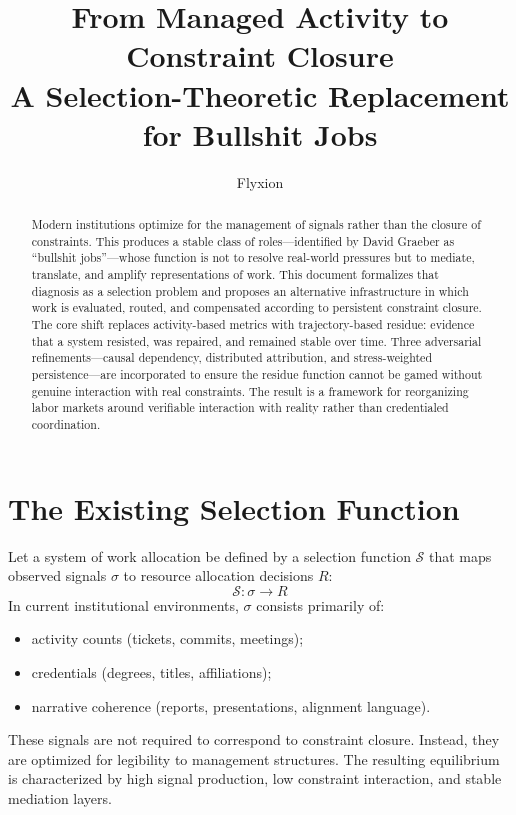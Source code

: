 \documentclass[12pt]{article}
\title{\textbf{From Managed Activity to Constraint Closure}\\[0.5em]
\large A Selection-Theoretic Replacement for Bullshit Jobs}
\author{Flyxion}
\date{}
\begin{document}
\maketitle

\begin{abstract}
Modern institutions optimize for the management of signals rather than
the closure of constraints. This produces a stable class of
roles---identified by David Graeber as ``bullshit jobs''---whose
function is not to resolve real-world pressures but to mediate,
translate, and amplify representations of work. This document
formalizes that diagnosis as a selection problem and proposes an
alternative infrastructure in which work is evaluated, routed, and
compensated according to persistent constraint closure. The core shift
replaces activity-based metrics with trajectory-based residue: evidence
that a system resisted, was repaired, and remained stable over time.
Three adversarial refinements---causal dependency, distributed
attribution, and stress-weighted persistence---are incorporated to
ensure the residue function cannot be gamed without genuine interaction
with real constraints. The result is a framework for reorganizing labor
markets around verifiable interaction with reality rather than
credentialed coordination.
\end{abstract}

\section{The Existing Selection Function}

Let a system of work allocation be defined by a selection function
$\mathcal{S}$ that maps observed signals $\sigma$ to resource allocation
decisions $R$:
\[
  \mathcal{S} : \sigma \rightarrow R
\]
In current institutional environments, $\sigma$ consists primarily of:
\begin{itemize}
  \item activity counts (tickets, commits, meetings);
  \item credentials (degrees, titles, affiliations);
  \item narrative coherence (reports, presentations, alignment language).
\end{itemize}

These signals are not required to correspond to constraint closure.
Instead, they are optimized for legibility to management structures.
The resulting equilibrium is characterized by high signal production,
low constraint interaction, and stable mediation layers.
\end{document}
